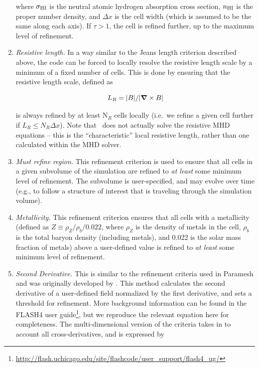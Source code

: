 \begin{enumerate}
where $\sigma_{\rm HI}$ is the neutral atomic hydrogen absorption
cross section, $n_{\rm HI}$ is the proper  number density,
and $\Delta x$ is the cell width (which is assumed to be the same
along each axis).  If $\tau > 1$, the cell is refined further, up to
the maximum level of refinement.

\item{\em Resistive length.}  In a way similar to the Jeans length
  criterion described above, the code can be forced to locally resolve
  the resistive length scale by a minimum of a fixed number of cells.
  This is done by ensuring that the resistive length scale, defined as

\begin{equation}
L_R = |B| / |\curl B|
\end{equation}

is always refined by at least N$_R$ cells locally (i.e.~we refine a
given cell further if $L_R \leq N_R \Delta x$).  Note that \enzo\ does
not actually solve the resistive MHD equations -- this is the
``characteristic'' local resistive length, rather than one calculated
within the MHD solver.

\item{\em Must refine region.}  This refinement criterion is used to
  ensure that all cells in a given subvolume of the simulation are
  refined to {\it at least} some minimum level of refinement.  The
  subvolume is user-specified, and may evolve over time (e.g., to
  follow a structure of interest that is traveling through the
  simulation volume).

\item{\em Metallicity.}  This refinement criterion ensures that all
  cells with a metallicity (defined as $Z \equiv \rho_{Z} / \rho_{b} /
  0.022$, where $\rho_{Z}$ is the density of metals in the cell,
  $\rho_{b}$ is the total baryon density (including metals), and 0.022
  is the solar mass fraction of metals) above a user-defined value is
  refined to {\it at least} some minimum level of refinement. 

\item{\em Second Derivative.}  This is similar to the refinement criteria used
  in Paramesh and was originally developed by \cite{1987nasa.reptQ....L}.  This
  method calculates the second derivative of a user-defined field normalized by
  the first derivative, and sets a threshold for refinement.  More background
  information can be found in the FLASH4 user guide\footnote{\url{http://flash.uchicago.edu/site/flashcode/user\_support/flash4\_ug/}},
  but we reproduce the relevant equation here for completeness. The
  multi-dimensional version of the criteria takes in to account all
  cross-derivatives, and is expressed by


\end{enumerate}

